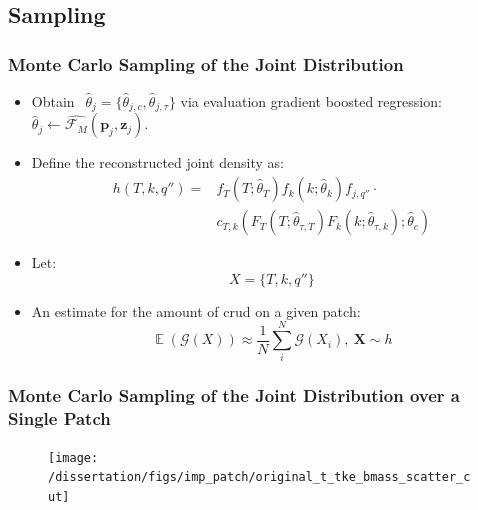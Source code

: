 \documentclass[t, pdftex]{beamer}
\DeclareMathOperator*{\E}{\mathbb{E}}
\begin{document}
\subsection*{Sampling}
\begin{frame}
\frametitle{Monte Carlo Sampling of the Joint Distribution}
\vspace{-16pt}
\begin{itemize}
    \item Obtain $\ \ \hat \theta_j = \{\hat \theta_{j,c}, \hat \theta_{j,\tau} \}$ via evaluation gradient boosted regression: $\hat \theta_j \leftarrow \hat{\mathcal F_M}(\mathbf p_j, \mathbf z_j)$.
    \item Define the reconstructed joint density as:
\begin{align}
h(T, k, q'') = & f_T(T;\hat \theta_T) f_k(k;\hat \theta_k) f_{j,q''} \cdot \nonumber \\
& c_{T,k}(F_T(T;\hat \theta_{\tau,T})F_k(k;\hat \theta_{\tau,k});\hat \theta_c) \nonumber
\label{eq:joint_t_tke_q}
\end{align} 

\item Let:
\[ X=\{T, k, q''\} \]

\item An estimate for the amount of crud on a given patch:
\begin{equation}
\E(\mathcal G(X)) \approx \frac{1}{N} \sum_i^N \mathcal G(X_i), \ \mathbf{X} \sim {h} \nonumber
\label{eq:mc_expected_crud}
\end{equation}
\end{itemize}
\end{frame}

\begin{frame}
\frametitle{\small Monte Carlo Sampling of the Joint Distribution over a Single Patch}
\vspace{-16pt}
\begin{figure}[!htbp]
    \centering
    \texttt{[image: /dissertation/figs/imp\_patch/original\_t\_tke\_bmass\_scatter\_cut]}
    \label{model_overview}
\end{figure}
\end{frame}
\end{document}

